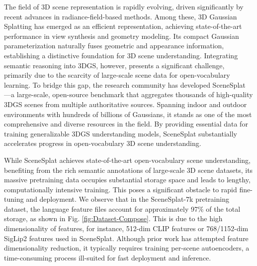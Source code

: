 \documentclass[runningheads]{llncs}
\begin{document}
The field of 3D scene representation is rapidly evolving, driven significantly by recent advances in radiance-field-based methods. Among these, 3D Gaussian Splatting \cite{kerbl3Dgaussians} has emerged as an efficient representation, achieving state-of-the-art performance in view synthesis and geometry modeling. Its compact Gaussian parameterization naturally fuses geometric and appearance information, establishing a distinctive foundation for 3D scene understanding.
Integrating semantic reasoning into 3DGS, however, presents a significant challenge, primarily due to the scarcity of large-scale scene data for open-vocabulary learning. To bridge this gap, the research community has developed SceneSplat \cite{li2025scenesplat,ma2025scenesplatpp}—a large-scale, open-source benchmark that aggregates thousands of high-quality 3DGS scenes from multiple authoritative sources. Spanning indoor and outdoor environments with hundreds of billions of Gaussians, it stands as one of the most comprehensive and diverse resources in the field. By providing essential data for training generalizable 3DGS understanding models, SceneSplat substantially accelerates progress in open-vocabulary 3D scene understanding.

While SceneSplat achieves state-of-the-art open-vocabulary scene understanding, benefiting from the rich semantic annotations of large-scale 3D scene datasets, its massive pretraining data occupies substantial storage space and leads to lengthy, computationally intensive training. This poses a significant obstacle to rapid fine-tuning and deployment. We observe that in the SceneSplat-7k pretraining dataset, the language feature files account for approximately 97\% of the total storage, as shown in Fig. \ref{fig:Dataset-Compose}. This is due to the high dimensionality of features, for instance, 512-dim CLIP \cite{big_vision} features or 768/1152-dim SigLip2 \cite{tschannen2025siglip} features used in SceneSplat. Although prior work has attempted feature dimensionality reduction, it typically requires training per-scene autoencoders, a time-consuming process ill-suited for fast deployment and inference.
\end{document}
